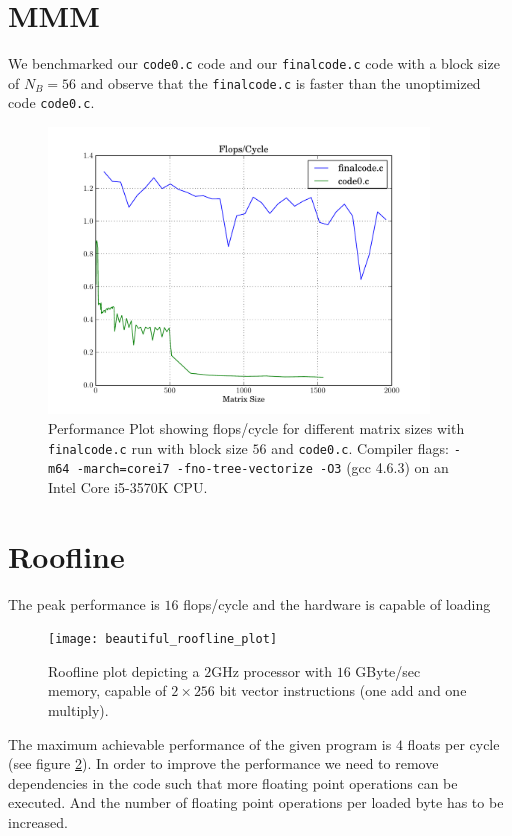 \documentclass[portrait,a4paper]{article}
\begin{document}
\section{MMM}
We benchmarked our \lstinline{code0.c} code and our \lstinline{finalcode.c} code with a block size of $N_B=56$ and observe that the \lstinline{finalcode.c} is faster than the unoptimized code \lstinline{code0.c}.
\begin{figure}[H]
    \centering
    \includegraphics[width=0.9\textwidth]{code/flops_cycle_matrix}
    \caption{Performance Plot showing flops/cycle for different matrix sizes with \lstinline{finalcode.c} run with block size $56$ and \lstinline{code0.c}. Compiler flags: \texttt{-m64 -march=corei7 -fno-tree-vectorize -O3} (gcc 4.6.3) on an Intel Core i5-3570K CPU.}
    \label{fig:matrix_cycle}
\end{figure}  

\section{Roofline}
The peak performance is $16$ flops/cycle and the hardware is capable of loading 
\begin{figure}[H]
    \centering
    \texttt{[image: beautiful\_roofline\_plot]}
    \caption{Roofline plot depicting a $2$GHz processor with $16$ GByte/sec memory, capable of $2\times256$ bit vector instructions (one add and one multiply).}
    \label{fig:roofline}
\end{figure}
The maximum achievable performance of the given program is $4$ floats per cycle (see figure \ref{fig:roofline}). In order to improve the performance we need to remove dependencies in the code such that more floating point operations can be executed. And the number of floating point operations per loaded byte has to be increased.
\end{document}
